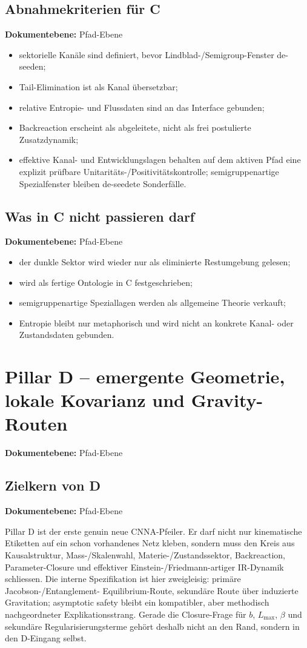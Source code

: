 \documentclass[11pt,a4paper]{article}
\newcommand{\code}[1]{\ifmmode\text{\ttfamily\seqsplit{#1}}\else\begingroup\ttfamily\seqsplit{#1}\endgroup\fi}
\newcommand{\doclevel}[1]{\par\small\noindent\textbf{Dokumentebene:} #1\par\normalsize\medskip}
\begin{document}
\subsection{Abnahmekriterien für C}
\doclevel{Pfad-Ebene}
\begin{itemize}
\item sektorielle Kanäle sind definiert, bevor Lindblad-/Semigroup-Fenster de-seeden;
\item Tail-Elimination ist als Kanal übersetzbar;
\item relative Entropie- und Flussdaten sind an das Interface gebunden;
\item Backreaction erscheint als abgeleitete, nicht als frei postulierte Zusatzdynamik;
\item effektive Kanal- und Entwicklungslagen behalten auf dem aktiven Pfad eine explizit prüfbare Unitaritäts-/Positivitätskontrolle; semigruppenartige Spezialfenster bleiben de-seedete Sonderfälle.
\end{itemize}

\subsection{Was in C nicht passieren darf}
\doclevel{Pfad-Ebene}
\begin{itemize}
\item der dunkle Sektor wird wieder nur als eliminierte Restumgebung gelesen;
\item \code{DerivedSpacetime} wird als fertige Ontologie in C festgeschrieben;
\item semigruppenartige Speziallagen werden als allgemeine Theorie verkauft;
\item Entropie bleibt nur metaphorisch und wird nicht an konkrete Kanal- oder Zustandsdaten gebunden.
\end{itemize}


\newpage
\section{Pillar D -- emergente Geometrie, lokale Kovarianz und Gravity-Routen}
\doclevel{Pfad-Ebene}

\subsection{Zielkern von D}
\doclevel{Pfad-Ebene}
Pillar D ist der erste genuin neue CNNA-Pfeiler. Er darf nicht nur kinematische Etiketten auf ein schon
vorhandenes Netz kleben, sondern muss den Kreis aus Kausalstruktur, Mass-/Skalenwahl,
Materie-/Zustandssektor, Backreaction, Parameter-Closure und effektiver Einstein-/Friedmann-artiger
IR-Dynamik schliessen. Die interne Spezifikation ist hier zweigleisig: primäre Jacobson-/Entanglement-
Equilibrium-Route, sekundäre Route über induzierte Gravitation; asymptotic safety bleibt ein
kompatibler, aber methodisch nachgeordneter Explikationsstrang. Gerade die Closure-Frage für \(b\),
\(L_{\max}\), \(\beta\) und sekundäre Regularisierungsterme gehört deshalb nicht an den Rand,
sondern in den D-Eingang selbst.\cite[pp.~30--31, 34--35, 44--47]{CNNASpec}
\end{document}
